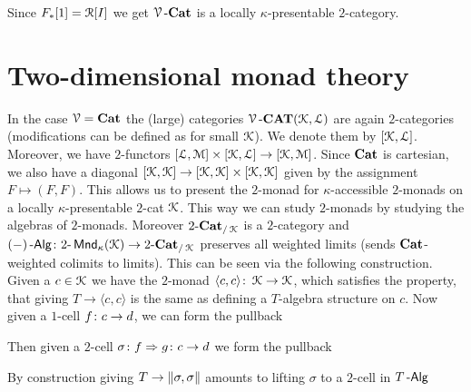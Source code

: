 \documentclass[a4paper,11pt,oneside,openany]{scrbook}
\begin{document}
\begin{rmk}
	Since $F_{\ast}[1] = \Rf[I]$ we get $\V\text{-}\Cat$ is a locally $\kappa$-presentable $2$-category.
\end{rmk}

\section{Two-dimensional monad theory}

In the case $\V=\Cat$ the (large) categories $\V\text{-}\CAT(\K,\Lf)$ are again $2$-categories (modifications can be defined as for small $\K$). We denote
them by $[\K,\Lf]$. Moreover, we have $2$-functors $[\Lf,\M] \times [\K,\Lf] \to [\K,\M]$. Since $\Cat$ is cartesian, we also have a diagonal
$[\K,\K] \to [\K,\K] \times [\K,\K]$ given by the assignment $F \mapsto (F,F)$. This allows us to present the $2$-monad for $\kappa$-accessible $2$-monads on
a locally $\kappa$-presentable $2$-cat $\K$. This way we can study $2$-monads by studying the algebras of $2$-monads. Moreover $2\text{-}\Cat_{/\K}$ is
a $2$-category and $(-)\Alg \from 2\text{-}\Mnd_{\kappa}(\K) \to 2\text{-}\Cat_{/\K}$ preserves all weighted limits (sends $\Cat$-weighted colimits to limits).
This can be seen via the following construction. Given a $c \in \K$ we have the $2$-monad $\langle c,c \rangle \from \K \to \K$, which satisfies the property, that
giving $T \to \langle c,c \rangle$ is the same as defining a $T$-algebra structure on $c$. Now given a $1$-cell $f \from c \to d$, we can form the pullback
\begin{center}
\end{center}
Then given a $2$-cell $\sigma \from f \Rightarrow g \from c \to d$ we form the pullback
\begin{center}
\end{center}
By construction giving $T \to \Arrowvert \sigma,\sigma \Arrowvert$ amounts to lifting $\sigma$ to a $2$-cell in $T\Alg$
\begin{center}
\end{center}
\end{document}
